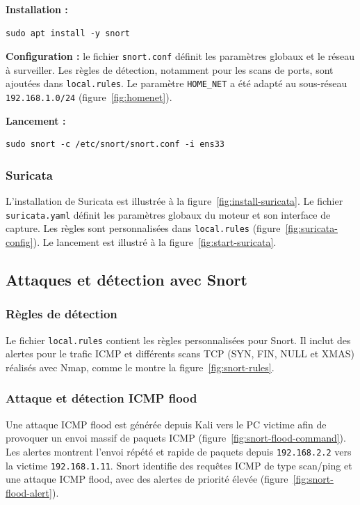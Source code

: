 \textbf{Installation :}
\begin{verbatim}
sudo apt install -y snort
\end{verbatim}

\textbf{Configuration :} le fichier \texttt{snort.conf} définit les paramètres globaux et le réseau à surveiller. Les règles de détection, notamment pour les scans de ports, sont ajoutées dans \texttt{local.rules}. Le paramètre \texttt{HOME\_NET} a été adapté au sous-réseau \texttt{192.168.1.0/24} (figure~\ref{fig:homenet}).

\textbf{Lancement :}
\begin{verbatim}
sudo snort -c /etc/snort/snort.conf -i ens33
\end{verbatim}

\subsubsection{Suricata}
L'installation de Suricata est illustrée à la figure~\ref{fig:install-suricata}. Le fichier \texttt{suricata.yaml} définit les paramètres globaux du moteur et son interface de capture. Les règles sont personnalisées dans \texttt{local.rules} (figure~\ref{fig:suricata-config}). Le lancement est illustré à la figure~\ref{fig:start-suricata}.
\FloatBarrier

\subsection{Attaques et détection avec Snort}
\subsubsection{Règles de détection}
Le fichier \texttt{local.rules} contient les règles personnalisées pour Snort. Il inclut des alertes pour le trafic ICMP et différents scans TCP (SYN, FIN, NULL et XMAS) réalisés avec Nmap, comme le montre la figure~\ref{fig:snort-rules}.

\subsubsection{Attaque et détection ICMP flood}
Une attaque ICMP flood est générée depuis Kali vers le PC victime afin de provoquer un envoi massif de paquets ICMP (figure~\ref{fig:snort-flood-command}). Les alertes montrent l'envoi répété et rapide de paquets depuis \texttt{192.168.2.2} vers la victime \texttt{192.168.1.11}. Snort identifie des requêtes ICMP de type scan/ping et une attaque ICMP flood, avec des alertes de priorité élevée (figure~\ref{fig:snort-flood-alert}).

